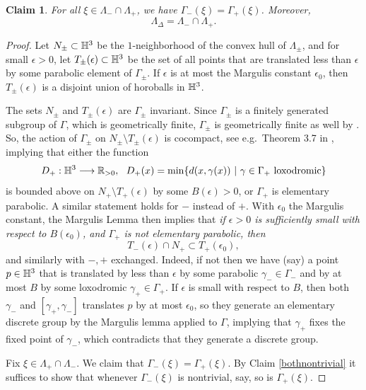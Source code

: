\documentclass[12pt]{amsart}
\newtheorem{claim}[theorem]{Claim}
\theoremstyle{definition}
\theoremstyle{remark}
\newcommand{\BR}{\mathbb R} \newcommand{\BD}{\mathbb D}
\begin{document}
\begin{claim}\label{intersectlimit}
	For all $\xi \in \Lambda_-\cap \Lambda_+$, we have $\Gamma_-(\xi)=\Gamma_+(\xi)$. Moreover,
	$$\Lambda_\Delta = \Lambda_- \cap \Lambda_+.$$\end{claim}
\begin{proof}
	Let $N_\pm\subset \mathbb H^3$ be the $1$-neighborhood of the convex hull of $\Lambda_\pm$, and for small $\epsilon>0$, let $T_\pm(\epsilon) \subset \mathbb H^3$ be the set of all points that are translated less than $\epsilon$ by some parabolic element of $\Gamma_\pm$. If $\epsilon$ is at most the Margulis constant $\epsilon_0$, then $T_\pm(\epsilon)$ is a disjoint union of horoballs in $\mathbb H^3$. 
	
	The sets $N_\pm $ and $T_\pm(\epsilon)$ are $\Gamma_\pm$ invariant. Since $\Gamma_\pm$ is a finitely generated subgroup of $
	\Gamma$, which is geometrically finite, $\Gamma_\pm$ is geometrically finite as well by \cite{Canarycovering}. So, the action of $\Gamma_\pm$ on $N_\pm \setminus T_\pm(\epsilon)$ is cocompact, see e.g.\ Theorem 3.7 in \cite{Matsuzakihyperbolic}, implying that either the function $$D_+ : \BH^3 \longrightarrow \BR_{>0}, \ \ D_+(x) = \min\{d(x,\gamma(x)) \ | \ \gamma \in \Gamma_+ \text{ loxodromic}\}$$
	is bounded above on $N_+ \setminus T_+(\epsilon)$ by some $B(\epsilon)>0$, or $\Gamma_+$ is elementary parabolic. A similar statement holds for $-$ instead of $+$.
	With $\epsilon_0$ the Margulis constant, the Margulis Lemma then implies that \emph{if $\epsilon>0$ is sufficiently small with respect to $B(\epsilon_0)$, and $\Gamma_+$ is not elementary parabolic, then} \begin{equation} \label{thin parts} T_-(\epsilon) \cap N_+\subset T_+(\epsilon_0),\end{equation}
	and similarly with $-,+$ exchanged.
	Indeed, if not then we have (say) a point $p \in \mathbb H^3$ that is translated by less than $\epsilon$ by some parabolic $\gamma_- \in \Gamma_-$ and by at most $B$ by some loxodromic $\gamma_+ \in \Gamma_+$. If $\epsilon$ is small with respect to $B$, then both $\gamma_-$ and $[\gamma_+,\gamma_-]$ translates $p$ by at most $\epsilon_0$, so they generate an elementary discrete group by the Margulis lemma applied to $\Gamma$, implying that $\gamma_+$ fixes the fixed point of $\gamma_-$, which contradicts that they generate a discrete group.
	
	\medskip
	
	Fix $\xi \in \Lambda_+ \cap \Lambda_-$. We claim that $\Gamma_-(\xi)=\Gamma_+(\xi)$. By Claim \ref{bothnontrivial} it suffices to show that whenever $\Gamma_-(\xi)$ is nontrivial, say, so is $\Gamma_+(\xi)$.
	

\end{proof}
\end{document}
